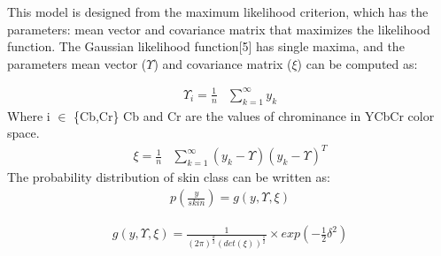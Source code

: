 \documentclass[conference]{IEEEtran}
\begin{document}
This model is designed from the maximum likelihood criterion, which has the parameters: mean vector and covariance matrix that maximizes the likelihood function. The Gaussian likelihood function[5] has single maxima, and the parameters mean vector ($\Upsilon$) and covariance matrix ($\xi$) can be computed as:

\begin{equation}
\begin{aligned}
\Upsilon_i = \frac{1}{n} & \sum_{k=1}^\infty y_k
\end{aligned}
\end{equation}
Where i $\in$ \{Cb,Cr\}  Cb and Cr are the values of chrominance in YCbCr color space.
\begin{equation}
\begin{aligned}
\xi = \frac{1}{n} & \sum_{k=1}^\infty \left(y_k - \Upsilon \right)\left(y_k - \Upsilon \right)^T
\end{aligned}
\end{equation}
The probability distribution of skin class can be written as:
\begin{equation}
\begin{aligned}
p(\frac{y}{skin}) =  g(y,\Upsilon,\xi)
\end{aligned}
\end{equation}

\begin{equation}
\begin{aligned}
g(y,\Upsilon,\xi) =  \frac{1}{(2\pi)^{\frac{d}{2}}\left(det\left(\xi \right)\right)^\frac{1}{2}} \times exp(-\frac{1}{2}\delta^2)
\end{aligned}
\end{equation}
\end{document}
